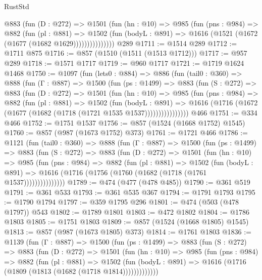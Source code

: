 \begin{lexlean}{RustStd}
\begin{coremodule}
              @883
                (fun (D : @272) =>
                @1501
                  (fun (hn : @10) =>
                  @985
                    (fun (pns : @984) =>
                    @882
                      (fun (pl : @881) =>
                      @1502
                        (fun (bodyL : @891) =>
                        @1616 (@1521 (@1672 (@1677 (@1682 @1629)))))))))))))))
    @289
@1711 := @1514 @289
@1712 := @1711 @875
@1716 := @857 (@1510 (@1511 (@1513 @1712)))
@1717 := @957 @289
@1718 := @1571 @1717
@1719 := @960 @1717
@1721 := @1719 @1624 @1468
@1750 := @1097
    (fun (lets0 : @884) =>
    @886
      (fun (tail0 : @360) =>
      @888
        (fun (Γ : @887) =>
        @1500
          (fun (ps : @1499) =>
          @883
            (fun (S : @272) =>
            @883
              (fun (D : @272) =>
              @1501
                (fun (hn : @10) =>
                @985
                  (fun (pns : @984) =>
                  @882
                    (fun (pl : @881) =>
                    @1502
                      (fun (bodyL : @891) =>
                      @1616 (@1716 (@1672 (@1677 (@1682 (@1718 (@1721 @1535 @1537))))))))))))))))
    @466
@1751 := @334 @466
@1752 := @1751 @1537
@1756 := @857 (@1524 (@1668 @1752) @1545)
@1760 := @857 (@987 (@1673 @1752) @373)
@1761 := @1721 @466
@1786 := @1121
    (fun (tail0 : @360) =>
    @888
      (fun (Γ : @887) =>
      @1500
        (fun (ps : @1499) =>
        @883
          (fun (S : @272) =>
          @883
            (fun (D : @272) =>
            @1501
              (fun (hn : @10) =>
              @985
                (fun (pns : @984) =>
                @882
                  (fun (pl : @881) =>
                  @1502
                    (fun (bodyL : @891) =>
                    @1616 (@1716 (@1756 (@1760 (@1682 (@1718 (@1761 @1537)))))))))))))))
@1789 := @474 (@477 (@478 @485))
@1790 := @361 @519
@1791 := @361 @533
@1793 := @361 @535 @367
@1794 := @1791 @1793
@1795 := @1790 @1794
@1797 := @359 @1795 @296
@1801 := @474 (@503 (@478 @1797)) @543
@1802 := @1789 @1801
@1803 := @472 @1802
@1804 := @1786 @1803
@1805 := @1751 @1803
@1809 := @857 (@1524 (@1668 @1805) @1545)
@1813 := @857 (@987 (@1673 @1805) @373)
@1814 := @1761 @1803
@1836 := @1139
    (fun (Γ : @887) =>
    @1500
      (fun (ps : @1499) =>
      @883
        (fun (S : @272) =>
        @883
          (fun (D : @272) =>
          @1501
            (fun (hn : @10) =>
            @985
              (fun (pns : @984) =>
              @882
                (fun (pl : @881) =>
                @1502
                  (fun (bodyL : @891) => @1616 (@1716 (@1809 (@1813 (@1682 (@1718 @1814)))))))))))))

\end{coremodule}
\end{lexlean}
